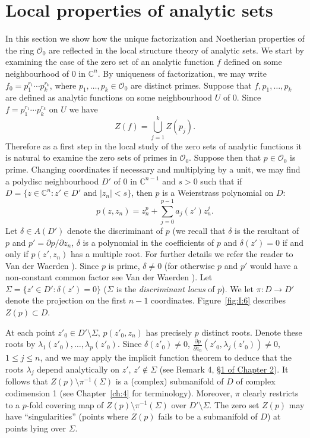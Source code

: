 \section{Local properties of analytic sets}\label{sec:3:5}
In this section we show how the unique factorization and Noetherian properties of the ring $\mathcal O_0$ are reflected in the local structure theory of analytic sets.
We start by examining the case of the zero set of an analytic function $f$ defined on some neighbourhood of $0$ in $\mathbb C^n$. By uniqueness of factorization, we may write $f_0=p_1^{r_1}\cdots p_k^{r_k}$, where $p_1,\ldots,p_k\in\mathcal O_0$ are distinct primes. Suppose that $f,p_1,\ldots,p_k$ are defined as analytic functions on some neighbourhood $U$ of $0$. Since $f=p_1^{r_1}\cdots p_k^{r_k}$ on $U$ we have
\[Z(f)=\bigcup_{j=1}^k Z(p_j).\]
Therefore as a first step in the local study of the zero sets of analytic functions it is natural to examine the zero sets of primes in $\mathcal O_0$. Suppose then that $p\in\mathcal O_0$ is prime. Changing coordinates if necessary and multiplying by a unit, we may find a polydisc neighbourhood $D'$ of $0$ in $\mathbb C^{n-1}$ and $s>0$ such that if $D=\{z\in\mathbb C^n:z'\in D'\text{ and }|z_n|<s\}$, then $p$ is a Weierstrass polynomial on $D$:
\[p(z,z_n)=z_n^p+\sum_{j=0}^{p-1}a_j(z')z_n^j.\]
Let $\delta\in A(D')$ denote the discriminant of $p$ (we recall that $\delta$ is the resultant of $p$ and $p'=\partial p/\partial z_n$, $\delta$ is a polynomial in the coefficients of $p$ and $\delta(z')=0$ if and only if $p(z',z_n)$ has a multiple root. For further details we refer the reader to Van der Waerden \cite{bib:I:waerden-b-l-van-der:1}). Since $p$ is prime, $\delta\ne0$ (for otherwise $p$ and $p'$ would have a non-constant common factor see Van der Waerden \cite{bib:I:waerden-b-l-van-der:1}). Let $\Sigma=\{z'\in D':\delta(z')=0\}$ ($\Sigma$ is the \emph{discriminant locus} of $p$). We let $\pi:D\to D'$ denote the projection on the first $n-1$ coordinates. Figure~\ref{fig:I:6} describes $Z(p)\subset D$.
\begin{center}
    \begin{minipage}{\linewidth}
        \centering
        \setlength{\unitlength}{0.8pt}
        
    \end{minipage}
\end{center}
At each point $z'_0\in D'\setminus\Sigma$, $p(z'_0,z_n)$ has precisely $p$ distinct roots. Denote these roots by $\lambda_1(z'_0),\ldots,\lambda_p(z'_0)$. Since $\delta(z'_0)\ne0$, $\frac{\partial p}{\partial z_n}(z'_0,\lambda_j(z'_0))\ne0$, $1\leq j\leq n$, and we may apply the implicit function theorem to deduce that the roots $\lambda_j$ depend analytically on $z'$, $z'\notin\Sigma$ (see Remark 4, \hyperref[sec:2:1]{\S1 of Chapter 2}). It follows that $Z(p)\setminus\pi^{-1}(\Sigma)$ is a (complex) submanifold of $D$ of complex codimension 1 (see Chapter~\ref{ch:4} for terminology). Moreover, $\pi$ clearly restricts to a $p$-fold covering map of $Z(p)\setminus\pi^{-1}(\Sigma)$ over $D'\setminus\Sigma$. The zero set $Z(p)$ may have ``singularities'' (points where $Z(p)$ fails to be a submanifold of $D$) at points lying over $\Sigma$.

